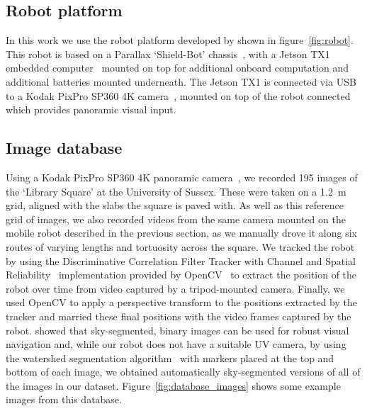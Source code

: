 \documentclass[letterpaper]{article}
\begin{document}
\subsection{Robot platform}
\label{sec:robot_platform}
In this work we use the robot platform developed by \citet{Domcsek2018} shown in figure~\ref{fig:robot}.
This robot is based on a Parallax `Shield-Bot' chassis~\citep{ParallaxInc}, with a Jetson TX1 embedded computer~\citep{NVIDIACorporation2016} mounted on top for additional onboard computation and additional batteries mounted underneath. 
The Jetson TX1 is connected via USB to a Kodak PixPro SP360 4K camera~\citep{JKImagingLtd}, mounted on top of the robot connected which provides panoramic visual input.

\subsection{Image database}
\label{sec:image_database}
Using a Kodak PixPro SP360 4K panoramic camera~\citep{JKImagingLtd}, we recorded \num{195} images of the ‘Library Square’ at the University of Sussex. 
These were taken on a \SI{1.2}{\metre} grid, aligned with the slabs the square is paved with.
As well as this reference grid of images, we also recorded videos from the same camera mounted on the mobile robot described in the previous section, as we manually drove it along six routes of varying lengths and tortuosity across the square. 
We tracked the robot by using the Discriminative Correlation Filter Tracker with Channel and Spatial Reliability~\citep{Lukezic2018} implementation provided by OpenCV~\citep{OpenCV} to extract the position of the robot over time from video captured by a tripod-mounted camera. 
Finally, we used OpenCV to apply a perspective transform to the positions extracted by the tracker and married these final positions with the video frames captured by the robot. 
\citet{Stone2014} showed that sky-segmented, binary images can be used for robust visual navigation and, while our robot does not have a suitable UV camera, by using the watershed segmentation algorithm~\citep{Beucher1979} with markers placed at the top and bottom of each image, we obtained automatically sky-segmented versions of all of the images in our dataset.
Figure~\ref{fig:database_images} shows some example images from this database.
\end{document}
